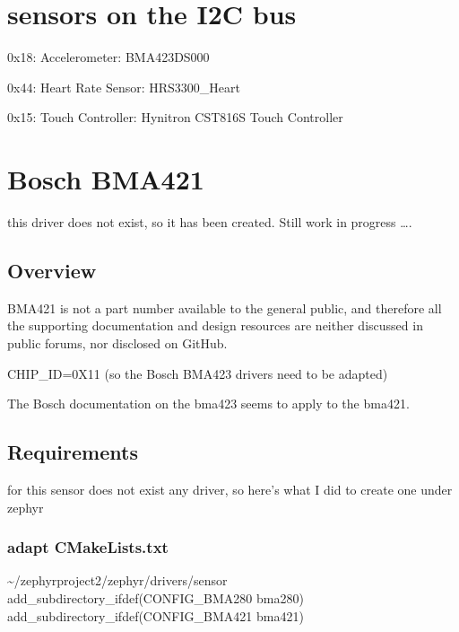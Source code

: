 \documentclass[letterpaper,10pt,english]{sphinxmanual}
\begin{document}


\section{sensors on the I2C bus}
\label{\detokenize{drivers/sensors:sensors-on-the-i2c-bus}}\label{\detokenize{drivers/sensors::doc}}
0x18: Accelerometer: BMA423\sphinxhyphen{}DS000

0x44: Heart Rate Sensor: HRS3300\_Heart

0x15: Touch Controller: Hynitron CST816S Touch Controller


\section{Bosch BMA421}
\label{\detokenize{drivers/bma421:bosch-bma421}}\label{\detokenize{drivers/bma421::doc}}
this driver does not exist, so it has been created.
Still work in progress ….

\begin{sphinxVerbatim}[commandchars=\\\{\}]
\end{sphinxVerbatim}


\subsection{Overview}
\label{\detokenize{drivers/bma421:overview}}
BMA421 is not a part number available to the general public, and therefore all the supporting documentation and design resources are neither discussed in public forums, nor disclosed on GitHub.

CHIP\_ID=0X11  (so the Bosch BMA423 drivers need to be adapted)

The Bosch documentation on the bma423 seems to apply to the bma421.


\subsection{Requirements}
\label{\detokenize{drivers/bma421:requirements}}
for this sensor does not exist any driver, so here’s what I did to create one under zephyr


\subsubsection{adapt CMakeLists.txt}
\label{\detokenize{drivers/bma421:adapt-cmakelists-txt}}
\textasciitilde{}/zephyrproject\sphinxhyphen{}2/zephyr/drivers/sensor
add\_subdirectory\_ifdef(CONFIG\_BMA280            bma280)
add\_subdirectory\_ifdef(CONFIG\_BMA421            bma421)
\end{document}
